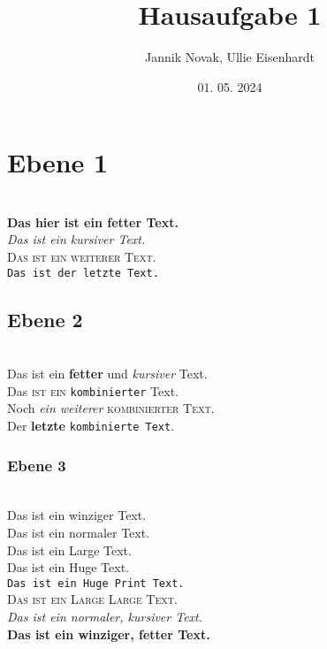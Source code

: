 \documentclass{article}
\title{Hausaufgabe 1}
\author{Jannik Novak, Ullie Eisenhardt}
\date{01. 05. 2024}
\begin{document}
\maketitle

\clearpage

\tableofcontents

\clearpage

\section{Ebene 1}

\blindtext
\\

\textbf{Das hier ist ein fetter Text.} 
\\

\textit{Das ist ein kursiver Text.}
\\

\textsc{Das ist ein weiterer Text.}
\\

\texttt{Das ist der letzte Text.}
\\

\subsection{Ebene 2}

\blindtext
\\

Das ist ein \textbf{fetter} und \textit{kursiver} Text.
\\

Das \textsc{ist ein} \texttt{kombinierter} Text.
\\

Noch \textit{ein weiterer} \textsc{kombinierter Text}.
\\

Der \textbf{letzte} \texttt{kombinierte Text}.

\clearpage

\subsubsection{Ebene 3}

\blindtext
\\

\scriptsize{Das ist ein winziger Text.}
\\

\normalsize{Das ist ein normaler Text.}
\\

\Large{Das ist ein Large Text.}
\\

\Huge{Das ist ein Huge Text.}
\\

\Huge{\texttt{Das ist ein Huge Print Text.}}
\\

\Large{\textsc{Das ist ein Large Large Text.}}
\\

\normalsize{\textit{Das ist ein normaler, kursiver Text.}}
\\

\scriptsize{\textbf{Das ist ein winziger, fetter Text.}}
\end{document}

